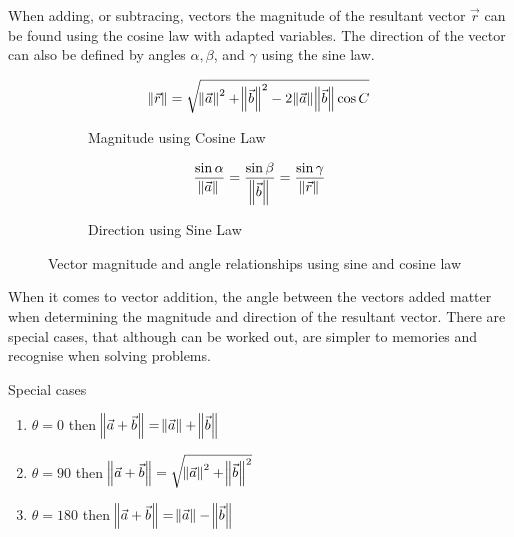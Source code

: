 \documentclass[12.5pt]{article}
\begin{document}
\begin{flushleft}
            \clearpage

            When adding, or subtracing, vectors the magnitude of the resultant vector $\vec{r}$ can be found using the
            cosine law with adapted variables. The direction of the vector can also be defined by angles $\alpha, \beta$, and $\gamma$
            using the sine law. 

            \begin{figure}[h]
                \begin{mdframed}
                    \centering
                    \begin{subfigure}[b]{0.4\linewidth}
                        \centering
                        \[ \norm{\vec{r}} = \sqrt{\norm{\vec{a}}^2 + \norm{\vec{b}}^2 - 2\norm{\vec{a}}\norm{\vec{b}}\cos{C}}\]
                        \caption{Magnitude using Cosine Law}
                    \end{subfigure}
                    \centering
                    \begin{subfigure}[b]{0.4\linewidth}
                        \centering
                        \[ \frac{\sin\alpha}{\norm{\vec{a}}} = \frac{\sin\beta}{\norm{\vec{b}}} = \frac{\sin\gamma}{\norm{\vec{r}}} \]
                        \caption{Direction using Sine Law}
                    \end{subfigure}
                    \caption{Vector magnitude and angle relationships using sine and cosine law}
                \end{mdframed}
            \end{figure}
            
            When it comes to vector addition, the angle between the vectors added matter when determining the magnitude and 
            direction of the resultant vector. There are special cases, that although can be worked out, are simpler to 
            memories and recognise when solving problems.

            \begin{mdframed}

                Special cases

                \begin{enumerate}
                    \item $\theta = 0$ then $\norm{\vec{a} + \vec{b}} = \norm{\vec{a}} + \norm{\vec{b}}$
                    \item $\theta = 90$ then $\norm{\vec{a} + \vec{b}} = \sqrt{\norm{\vec{a}}^2 + \norm{\vec{b}}^2}$
                    \item $\theta = 180$ then $\norm{\vec{a} + \vec{b}} = \norm{\vec{a}} - \norm{\vec{b}}$
                \end{enumerate}
            \end{mdframed}

        \end{flushleft}
\end{document}

